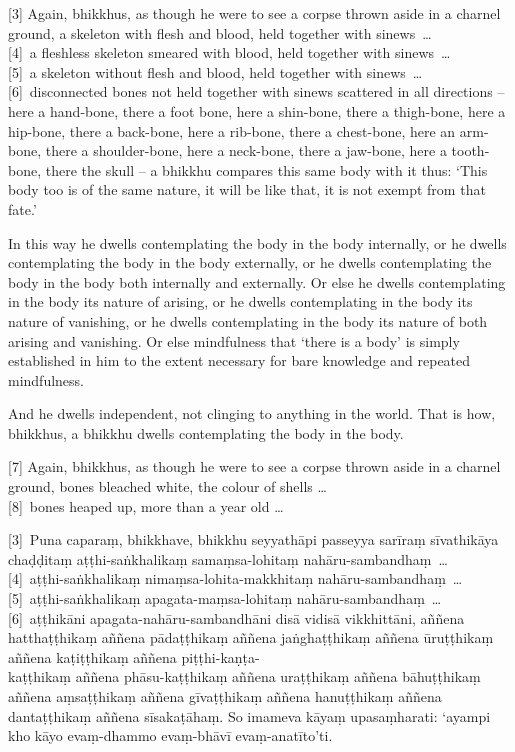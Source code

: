 [3] Again, bhikkhus, as though he were to see a corpse thrown aside in a
charnel ground, a skeleton with flesh and blood, held together with sinews~\ldots{}\\
{}[4]~a fleshless skeleton smeared with blood, held together with sinews~\ldots{}\\
{}[5]~a skeleton without flesh and blood, held together with sinews~\ldots{}\\
{}[6]~disconnected bones not held together with sinews scattered in all directions
-- here a hand-bone, there a foot bone, here a shin-bone, there a thigh-bone,
here a hip-bone, there a back-bone, here a rib-bone, there a chest-bone, here an
arm-bone, there a shoulder-bone, here a neck-bone, there a jaw-bone, here a
tooth-bone, there the skull -- a bhikkhu compares this same body with it thus:
`This body too is of the same nature, it will be like that, it is not exempt
from that fate.'

In this way he dwells contemplating the body in the body internally, or he
dwells contemplating the body in the body externally, or he dwells contemplating
the body in the body both internally and externally. Or else he dwells
contemplating in the body its nature of arising, or he dwells contemplating in
the body its nature of vanishing, or he dwells contemplating in the body its
nature of both arising and vanishing. Or else mindfulness that ‘there is a body’
is simply established in him to the extent necessary for bare knowledge and
repeated mindfulness.

And he dwells independent, not clinging to anything in the world. That is how,
bhikkhus, a bhikkhu dwells contemplating the body in the body.

[7] Again, bhikkhus, as though he were to see a corpse thrown aside in a charnel
ground, bones bleached white, the colour of shells \ldots{}\\
{}[8]~bones heaped up, more than a year old \ldots{}

\paliPage

[3]~Puna caparaṃ, bhikkhave, bhikkhu seyyathāpi passeyya sarīraṃ
sīvathikāya chaḍḍitaṃ aṭṭhi-saṅkhalikaṃ samaṃsa-lohitaṃ nahāru-sambandhaṃ~\ldots{}\\
{}[4]~aṭṭhi-saṅkhalikaṃ nimaṃsa-lohita-makkhitaṃ nahāru-sambandhaṃ~\ldots{}\\
{}[5]~aṭṭhi-saṅkhalikaṃ apagata-maṃsa-lohitaṃ nahāru-sambandhaṃ~\ldots{}\\
{}[6]~aṭṭhikāni apagata-nahāru-sambandhāni disā vidisā vikkhittāni, aññena
hatthaṭṭhikaṃ aññena pādaṭṭhikaṃ aññena jaṅghaṭṭhikaṃ aññena ūruṭṭhikaṃ aññena
kaṭiṭṭhikaṃ aññena piṭṭhi-kaṇṭa-\\
kaṭṭhikaṃ aññena phāsu-kaṭṭhikaṃ aññena uraṭṭhikaṃ
aññena bāhuṭṭhikaṃ aññena aṃsaṭṭhikaṃ aññena gīvaṭṭhikaṃ aññena hanuṭṭhikaṃ
aññena dantaṭṭhikaṃ aññena sīsakaṭāhaṃ. So imameva kāyaṃ upasaṃharati: ‘ayampi kho
kāyo evaṃ-dhammo evaṃ-bhāvī evaṃ-anatīto’ti.

